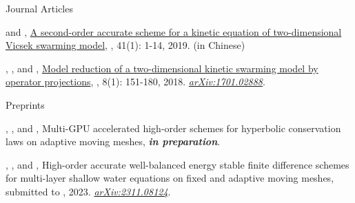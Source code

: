 \begin{cvpublicationsection}{Journal Articles}
%
\item[\pubenum]  and , \href{http://www.jxtu.net/xtdxxbzr/ch/reader/view_abstract.aspx?file_no=201901001&flag=1}{A second-order accurate scheme for a kinetic equation of two-dimensional Vicsek swarming model}, , 41(1): 1-14, 2019. (in Chinese)
%
\item[\pubenum] , , and , \href{https://doi.org/10.4208/eajam.170617.141117a}{Model reduction of a two-dimensional kinetic swarming model by operator projections}, , 8(1): 151-180, 2018. \href{https://arxiv.org/abs/1701.02888}{\em arXiv:1701.02888}.
\end{cvpublicationsection}

\begin{cvpublicationsection}{Preprints}
%
\item[\pubenum] , , and , Multi-GPU accelerated high-order schemes for hyperbolic conservation laws on adaptive moving meshes, {\em\bfseries in preparation}.
%
\item[\pubenum] , , and , High-order accurate well-balanced energy stable finite difference schemes for multi-layer shallow water equations on fixed and adaptive moving meshes, submitted to , 2023. \href{https://arxiv.org/abs/2311.08124}{\em arXiv:2311.08124}.
\end{cvpublicationsection}
